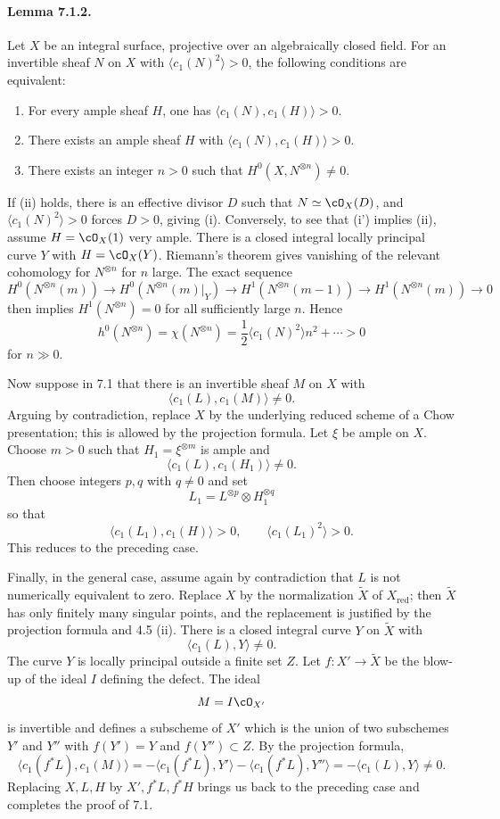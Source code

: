 \documentclass[11pt]{article}
\theoremstyle{plain}
\theoremstyle{definition}
\theoremstyle{remark}
\providecommand{\red}{\mathrm{red}}
\begin{document}
\paragraph{Lemma 7.1.2.}
Let $X$ be an integral surface, projective over an algebraically closed field. For an invertible sheaf $N$ on $X$ with $\langle c_1(N)^2\rangle>0$, the following conditions are equivalent:
\begin{enumerate}[label=\roman*)]
\item For every ample sheaf $H$, one has $\langle c_1(N),c_1(H)\rangle>0$.
\item[\textup{i'}] There exists an ample sheaf $H$ with $\langle c_1(N),c_1(H)\rangle>0$.
\item There exists an integer $n>0$ such that $H^0(X,N^{\otimes n})\neq 0$.
\end{enumerate}

If (ii) holds, there is an effective divisor $D$ such that $N\simeq\cO_X(D)$, and $\langle c_1(N)^2\rangle>0$ forces $D>0$, giving (i). Conversely, to see that (i') implies (ii), assume $H=\cO_X(1)$ very ample. There is a closed integral locally principal curve $Y$ with $H=\cO_X(Y)$. Riemann's theorem gives vanishing of the relevant cohomology for $N^{\otimes n}$ for $n$ large. The exact sequence
\[
H^0(N^{\otimes n}(m))\to H^0(N^{\otimes n}(m)|_Y)\to
H^1(N^{\otimes n}(m-1))\to H^1(N^{\otimes n}(m))\to 0
\]
then implies $H^1(N^{\otimes n})=0$ for all sufficiently large $n$. Hence
\[
h^0(N^{\otimes n})=\chi(N^{\otimes n})
  =\frac12\langle c_1(N)^2\rangle n^2+\cdots>0
\]
for $n\gg0$.

Now suppose in 7.1 that there is an invertible sheaf $M$ on $X$ with
\[
\langle c_1(L),c_1(M)\rangle\neq 0.
\]
Arguing by contradiction, replace $X$ by the underlying reduced scheme of a Chow presentation; this is allowed by the projection formula. Let $\xi$ be ample on $X$. Choose $m>0$ such that $H_1=\xi^{\otimes m}$ is ample and
\[
\langle c_1(L),c_1(H_1)\rangle\neq 0.
\]
Then choose integers $p,q$ with $q\neq0$ and set
\[
L_1=L^{\otimes p}\otimes H_1^{\otimes q}
\]
so that
\[
\langle c_1(L_1),c_1(H)\rangle>0,\qquad
\langle c_1(L_1)^2\rangle>0.
\]
This reduces to the preceding case.

Finally, in the general case, assume again by contradiction that $L$ is not numerically equivalent to zero. Replace $X$ by the normalization $\widetilde X$ of $X_{\red}$; then $\widetilde X$ has only finitely many singular points, and the replacement is justified by the projection formula and 4.5 (ii). There is a closed integral curve $Y$ on $\widetilde X$ with
\[
\langle c_1(L),Y\rangle\neq 0.
\]
The curve $Y$ is locally principal outside a finite set $Z$. Let $f:X'\to \widetilde X$ be the blow-up of the ideal $I$ defining the defect. The ideal
\[
M=I\cO_{X'}
\]
is invertible and defines a subscheme of $X'$ which is the union of two subschemes $Y'$ and $Y''$ with $f(Y')=Y$ and $f(Y'')\subset Z$. By the projection formula,
\[
\langle c_1(f^*L),c_1(M)\rangle
  =-\langle c_1(f^*L),Y'\rangle-\langle c_1(f^*L),Y''\rangle
  =-\langle c_1(L),Y\rangle\neq 0.
\]
Replacing $X,L,H$ by $X',f^*L,f^*H$ brings us back to the preceding case and completes the proof of 7.1.
\end{document}
